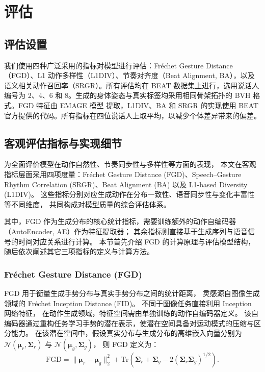 
\chapter{评估}

\section{评估设置}

我们使用四种广泛采用的指标对模型进行评估：Fréchet Gesture Distance（FGD）\cite{speech_gesture_generation}、L1 动作多样性（L1DIV）\cite{beatcamn}、节奏对齐度（Beat Alignment, BA）\cite{beatcamn}，以及语义相关动作召回率（SRGR）\cite{beatcamn}。所有评估均在 BEAT 数据集上进行，选用说话人编号为 2、4、6 和 8。生成的身体姿态与真实标签均采用相同骨架拓扑的 BVH 格式。FGD 特征由 EMAGE 模型 \cite{emage} 提取，L1DIV、BA 和 SRGR 的实现使用 BEAT 官方提供的代码。所有指标在四位说话人上取平均，以减少个体差异带来的偏差。

\section{客观评估指标与实现细节}
\label{sec:objective_metrics}

为全面评价模型在动作自然性、节奏同步性与多样性等方面的表现，
本文在客观指标层面采用四项度量：Fréchet Gesture Distance (FGD)、Speech–Gesture Rhythm Correlation (SRGR)、Beat Alignment (BA) 以及 L1-based Diversity (L1DIV)。
这些指标分别对应生成动作在分布一致性、语音同步性与变化丰富性等不同维度，
共同构成对模型质量的综合评估体系。

其中，FGD 作为生成分布的核心统计指标，需要训练额外的动作自编码器（AutoEncoder, AE）作为特征提取器；
其余指标则直接基于生成序列与语音信号的时间对应关系进行计算。
本节首先介绍 FGD 的计算原理与评估模型结构，
随后依次阐述其它三项指标的定义与计算方法。

\subsection{Fréchet Gesture Distance (FGD)}
\label{subsec:fgd}

FGD 用于衡量生成手势分布与真实手势分布之间的统计距离，
灵感源自图像生成领域的 Fréchet Inception Distance (FID)。
不同于图像任务直接利用 Inception 网络特征，
在动作生成领域，特征空间需由单独训练的动作自编码器定义。
该自编码器通过重构任务学习手势的潜在表示，使潜在空间具备对运动模式的压缩与区分能力。
在该潜在空间中，假设真实分布与生成分布的高维嵌入向量分别为
$\mathcal{N}(\bm{\mu}_r, \bm{\Sigma}_r)$ 与 $\mathcal{N}(\bm{\mu}_g, \bm{\Sigma}_g)$，
则 FGD 定义为：
\begin{equation}
\mathrm{FGD} = 
\|\bm{\mu}_r - \bm{\mu}_g\|_2^2 +
\mathrm{Tr}(\bm{\Sigma}_r + \bm{\Sigma}_g - 2(\bm{\Sigma}_r \bm{\Sigma}_g)^{1/2}).
\end{equation}

